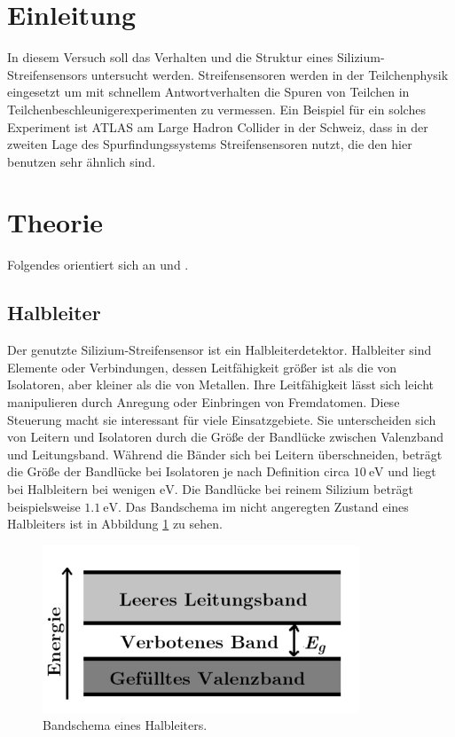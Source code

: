 \section{Einleitung}

In diesem Versuch soll das Verhalten und die Struktur eines Silizium-Streifensensors untersucht werden. Streifensensoren werden in der Teilchenphysik eingesetzt um mit schnellem Antwortverhalten die Spuren von Teilchen in Teilchenbeschleunigerexperimenten zu vermessen. Ein Beispiel für ein solches Experiment ist ATLAS am Large Hadron Collider in der Schweiz, dass in der zweiten Lage des Spurfindungssystems Streifensensoren nutzt, die den hier benutzen sehr ähnlich sind.


\section{Theorie}
\label{sec:Theorie}

Folgendes orientiert sich an \cite{anleitung} und \cite{goessling}.

\subsection{Halbleiter}

Der genutzte Silizium-Streifensensor ist ein Halbleiterdetektor. Halbleiter sind Elemente oder Verbindungen, dessen Leitfähigkeit größer ist als die von Isolatoren, aber kleiner als die von Metallen. Ihre Leitfähigkeit lässt sich leicht manipulieren durch Anregung oder Einbringen von Fremdatomen. Diese Steuerung macht sie interessant für viele Einsatzgebiete.
Sie unterscheiden sich von Leitern und Isolatoren durch die Größe der Bandlücke zwischen Valenzband und Leitungsband. Während die Bänder sich bei Leitern überschneiden, beträgt die Größe der Bandlücke bei Isolatoren je nach Definition circa $\SI{10}{\electronvolt}$ und liegt bei Halbleitern bei wenigen $\si{\electronvolt}$. Die Bandlücke bei reinem Silizium beträgt beispielsweise $\SI{1.1}{\electronvolt}$. Das Bandschema im nicht angeregten Zustand eines Halbleiters ist in Abbildung \ref{fig:bandmodell} zu sehen.

\begin{figure}
  \centering
  \includegraphics[height=5cm]{TimosAufrisse/bandmodell.png}
  \caption{Bandschema eines Halbleiters\cite{anleitung}.}
  \label{fig:bandmodell}
\end{figure}


